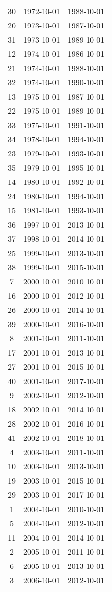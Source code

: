 % 
\begin{tabular}{ccc}
  \hline
  \hline
30 & 1972-10-01 & 1988-10-01 \\ 
  20 & 1973-10-01 & 1987-10-01 \\ 
  31 & 1973-10-01 & 1989-10-01 \\ 
  12 & 1974-10-01 & 1986-10-01 \\ 
  21 & 1974-10-01 & 1988-10-01 \\ 
  32 & 1974-10-01 & 1990-10-01 \\ 
  13 & 1975-10-01 & 1987-10-01 \\ 
  22 & 1975-10-01 & 1989-10-01 \\ 
  33 & 1975-10-01 & 1991-10-01 \\ 
  34 & 1978-10-01 & 1994-10-01 \\ 
  23 & 1979-10-01 & 1993-10-01 \\ 
  35 & 1979-10-01 & 1995-10-01 \\ 
  14 & 1980-10-01 & 1992-10-01 \\ 
  24 & 1980-10-01 & 1994-10-01 \\ 
  15 & 1981-10-01 & 1993-10-01 \\ 
  36 & 1997-10-01 & 2013-10-01 \\ 
  37 & 1998-10-01 & 2014-10-01 \\ 
  25 & 1999-10-01 & 2013-10-01 \\ 
  38 & 1999-10-01 & 2015-10-01 \\ 
  7 & 2000-10-01 & 2010-10-01 \\ 
  16 & 2000-10-01 & 2012-10-01 \\ 
  26 & 2000-10-01 & 2014-10-01 \\ 
  39 & 2000-10-01 & 2016-10-01 \\ 
  8 & 2001-10-01 & 2011-10-01 \\ 
  17 & 2001-10-01 & 2013-10-01 \\ 
  27 & 2001-10-01 & 2015-10-01 \\ 
  40 & 2001-10-01 & 2017-10-01 \\ 
  9 & 2002-10-01 & 2012-10-01 \\ 
  18 & 2002-10-01 & 2014-10-01 \\ 
  28 & 2002-10-01 & 2016-10-01 \\ 
  41 & 2002-10-01 & 2018-10-01 \\ 
  4 & 2003-10-01 & 2011-10-01 \\ 
  10 & 2003-10-01 & 2013-10-01 \\ 
  19 & 2003-10-01 & 2015-10-01 \\ 
  29 & 2003-10-01 & 2017-10-01 \\ 
  1 & 2004-10-01 & 2010-10-01 \\ 
  5 & 2004-10-01 & 2012-10-01 \\ 
  11 & 2004-10-01 & 2014-10-01 \\ 
  2 & 2005-10-01 & 2011-10-01 \\ 
  6 & 2005-10-01 & 2013-10-01 \\ 
  3 & 2006-10-01 & 2012-10-01 \\ 
   \hline
\end{tabular}
